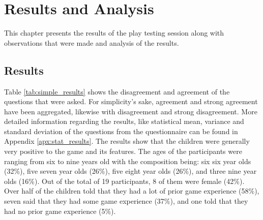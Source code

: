 \chapter{Results and Analysis}
\label{chp:analysis}
This chapter presents the results of the play testing session along with observations that were made and analysis of the results.


\section{Results}
Table \ref{tab:simple_results} shows the disagreement and agreement of the questions that were asked. For simplicity's sake, agreement and strong agreement have been aggregated, likewise with disagreement and strong disagreement.
More detailed information regarding the results, like statistical mean, variance and standard deviation of the questions from the questionnaire can be found in Appendix \ref{apx:stat_results}. The results show that the children were generally very positive to the game and its features.  The ages of the participants were ranging from six to nine years old with the composition being: six six year olds (32\%), five seven year olds (26\%), five eight year olds (26\%), and three nine year olds (16\%). Out of the total of 19 participants, 8 of them were female (42\%). Over half of the children told that they had a lot of prior game experience (58\%), seven said that they had some game experience (37\%), and one told that they had no prior game experience (5\%).

